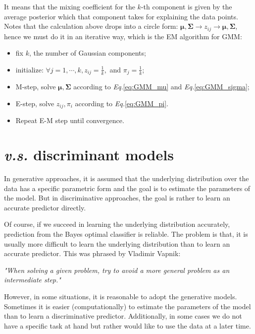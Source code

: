 \documentclass{article}
\begin{document}
	It means that the mixing coefficient for the $k$-th component is given by the average posterior which that component takes for explaining the data points. Notes that the calculation above drops into a circle form: $\bm{\mu}, \bm{\Sigma} \rightarrow z_{ij} \rightarrow \bm{\mu}, \bm{\Sigma}$, hence we must do it in an iterative way, which is the EM algorithm for GMM:
	
	
	\begin{minipage}{.9\linewidth}
    \begin{itemize}
	\item fix $k$, the number of Gaussian components;
	\item initialize: $\forall j=1,\cdots,k, z_{ij}=\frac{1}{k},$ and $\pi_j=\frac{1}{k}$;
	\item M-step, solve $\bm{\mu}, \bm{\Sigma}$ according to \textit{Eq.}\ref{eq:GMM_mu} and \textit{Eq.}\ref{eq:GMM_sigma};
	\item E-step, solve $z_{ij},\pi_i$ according to \textit{Eq.}\ref{eq:GMM_pi}.
	\item Repeat E-M step until convergence.
	\end{itemize}
  	\end{minipage}

		
\section{\textit{v.s.} discriminant models}
	\label{sec:final}
	In generative approaches, it is assumed that the underlying distribution over the data has a specific parametric form and the goal is to estimate the parameters of the model. But in discriminative approaches, the goal is rather to learn an accurate predictor directly. 
	
	Of course, if we succeed in learning the underlying distribution accurately, prediction from the Bayes optimal classifier is reliable. The problem is that, it is usually more difficult to learn the underlying distribution than to learn an accurate predictor. This was phrased by Vladimir Vapnik:
	\begin{center}
	\textit{"When solving a given problem, try to avoid a more general problem as an intermediate step."}
	\end{center}

	However, in some situations, it is reasonable to adopt the generative models. Sometimes it is easier (computationally) to estimate the parameters of the model than to learn a discriminative predictor. Additionally, in some cases we do not have a specific task at hand but rather would like to use the data at a later time.
	
\end{document}
